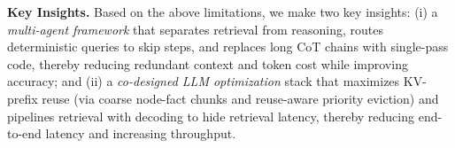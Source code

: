 






\textbf{Key Insights.}
Based on the above limitations, we make two key insights: 
(i) a \emph{multi-agent framework} that separates retrieval from reasoning, routes deterministic queries to skip steps, and replaces long CoT chains with single-pass code, thereby reducing redundant context and token cost while improving accuracy; and 
(ii) a \emph{co-designed LLM optimization} stack that maximizes KV-prefix reuse (via coarse node-fact chunks and reuse-aware priority eviction) and pipelines retrieval with decoding to hide retrieval latency, thereby reducing end-to-end latency and increasing throughput.


